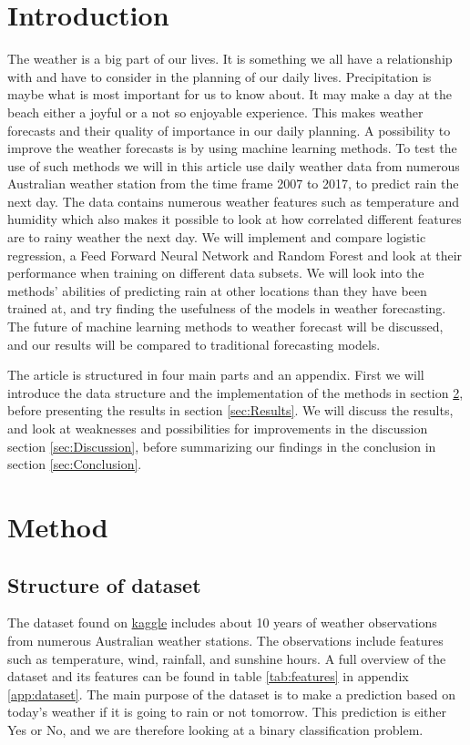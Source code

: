 \documentclass[11pt]{article}
\begin{document}
\section{Introduction}
The weather is a big part of our lives. It is something we all have a relationship with and have to consider in the planning of our daily lives. Precipitation is maybe what is most important for us to know about. It may make a day at the beach either a joyful or a not so enjoyable experience. This makes weather forecasts and their quality of importance in our daily planning. A possibility to improve the weather forecasts is by using machine learning methods. To test the use of such methods we will in this article use daily weather data from numerous Australian weather station from the time frame 2007 to 2017, to predict rain the next day. The data contains numerous weather features such as temperature and humidity which also makes it possible to look at how correlated different features are to rainy weather the next day. We will implement and compare logistic regression, a Feed Forward Neural Network and Random Forest and look at their performance when training on different data subsets. We will look into the methods' abilities of predicting rain at other locations than they have been trained at, and try finding the usefulness of the models in weather forecasting. The future of machine learning methods to weather forecast will be discussed, and our results will be compared to traditional forecasting models.

The article is structured in four main parts and an appendix. First we will introduce the data structure and the implementation of the methods in section \ref{sec:Method}, before presenting the results in section \ref{sec:Results}. We will discuss the results, and look at weaknesses and possibilities for improvements in the discussion section \ref{sec:Discussion}, before summarizing our findings in the conclusion in section \ref{sec:Conclusion}.
\section{Method}
\label{sec:Method}

\subsection{Structure of dataset} %

The dataset found on \href{https://www.kaggle.com/datasets/jsphyg/weather-dataset-rattle-package}{kaggle} includes about 10 years of weather observations from numerous Australian weather stations. The observations include features such as temperature, wind, rainfall, and sunshine hours. A full overview of the dataset and its features can be found in table \ref{tab:features} in appendix \ref{app:dataset}. The main purpose of the dataset is to make a prediction based on today's weather if it is going to rain or not tomorrow. This prediction is either Yes or No, and we are therefore looking at a binary classification problem.
\end{document}
